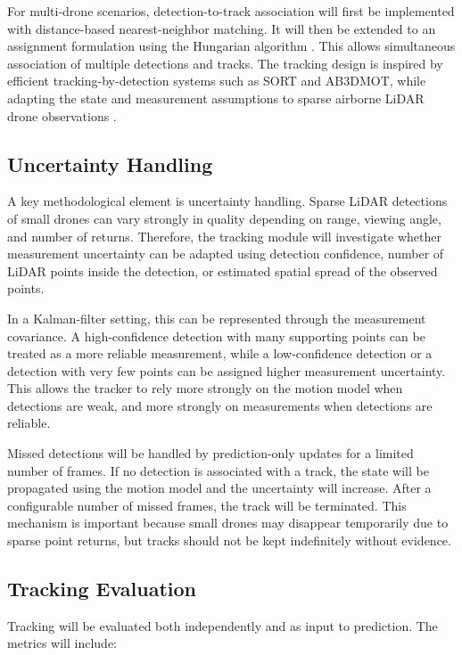 For multi-drone scenarios, detection-to-track association will first be implemented with distance-based nearest-neighbor matching. It will then be extended to an assignment formulation using the Hungarian algorithm \cite{kuhn1955hungarian}. This allows simultaneous association of multiple detections and tracks. The tracking design is inspired by efficient tracking-by-detection systems such as SORT and AB3DMOT, while adapting the state and measurement assumptions to sparse airborne LiDAR drone observations \cite{bewley2016sort,weng2020ab3dmot}.

\subsection{Uncertainty Handling}

A key methodological element is uncertainty handling. Sparse LiDAR detections of small drones can vary strongly in quality depending on range, viewing angle, and number of returns. Therefore, the tracking module will investigate whether measurement uncertainty can be adapted using detection confidence, number of LiDAR points inside the detection, or estimated spatial spread of the observed points.

In a Kalman-filter setting, this can be represented through the measurement covariance. A high-confidence detection with many supporting points can be treated as a more reliable measurement, while a low-confidence detection or a detection with very few points can be assigned higher measurement uncertainty. This allows the tracker to rely more strongly on the motion model when detections are weak, and more strongly on measurements when detections are reliable.

Missed detections will be handled by prediction-only updates for a limited number of frames. If no detection is associated with a track, the state will be propagated using the motion model and the uncertainty will increase. After a configurable number of missed frames, the track will be terminated. This mechanism is important because small drones may disappear temporarily due to sparse point returns, but tracks should not be kept indefinitely without evidence.

\subsection{Tracking Evaluation}

Tracking will be evaluated both independently and as input to prediction. The metrics will include:

